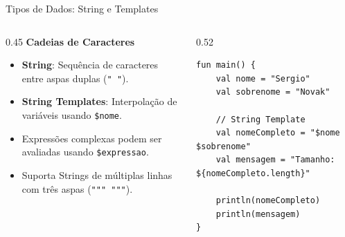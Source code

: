 \documentclass[aspectratio=169]{beamer}
\begin{document}
\begin{frame}[fragile]{Tipos de Dados: String e Templates}
  \begin{columns}[T]
    \begin{column}{0.45\textwidth}
      \textbf{Cadeias de Caracteres}
      \vspace{0.3em}
      \begin{itemize}\small
        \item \textbf{String}: Sequência de caracteres entre aspas duplas (\texttt{" "}).
        \item \textbf{String Templates}: Interpolação de variáveis usando \texttt{\$nome}.
        \item Expressões complexas podem ser avaliadas usando \texttt{\${expressao}}.
        \item Suporta Strings de múltiplas linhas com três aspas (\texttt{""" """}).
      \end{itemize}
    \end{column}
    \begin{column}{0.52\textwidth}
\begin{lstlisting}[style=KotlinStyle]
fun main() {
    val nome = "Sergio"
    val sobrenome = "Novak"
    
    // String Template
    val nomeCompleto = "$nome $sobrenome"
    val mensagem = "Tamanho: ${nomeCompleto.length}"

    println(nomeCompleto)
    println(mensagem)
}
\end{lstlisting}
    \end{column}
  \end{columns}
\end{frame}
\end{document}
